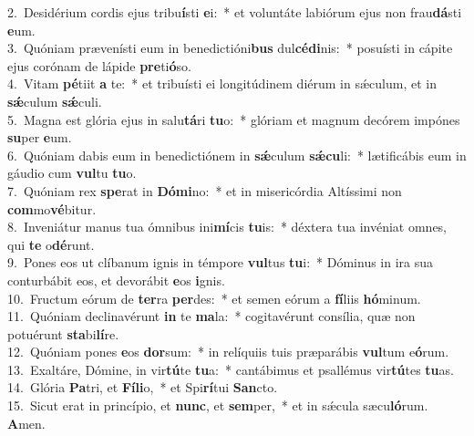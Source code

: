 {2.~}Desidérium cordis ejus tribu\textbf{í}sti \textbf{e}i:~* et voluntáte labiórum ejus non frau\textbf{dá}sti \textbf{e}um.\\
{3.~}Quóniam prævenísti eum in benedictióni\textbf{bus} dul\textbf{cé}\textbf{di}nis:~* posuísti in cápite ejus corónam de lápide \textbf{pre}ti\textbf{ó}so.\\
{4.~}Vitam \textbf{pé}tiit \textbf{a} te:~* et tribuísti ei longitúdinem diérum in sǽculum, et in \textbf{sǽ}culum \textbf{sǽ}culi.\\
{5.~}Magna est glória ejus in salu\textbf{tá}ri \textbf{tu}o:~* glóriam et magnum decórem impónes \textbf{su}per \textbf{e}um.\\
{6.~}Quóniam dabis eum in benedictiónem in \textbf{sǽ}culum \textbf{sǽ}\textbf{cu}li:~* lætificábis eum in gáudio cum \textbf{vul}tu \textbf{tu}o.\\
{7.~}Quóniam rex \textbf{spe}rat in \textbf{Dó}\textbf{mi}no:~* et in misericórdia Altíssimi non \textbf{com}mo\textbf{vé}bitur.\\
{8.~}Inveniátur manus tua ómnibus ini\textbf{mí}cis \textbf{tu}is:~* déxtera tua invéniat omnes, qui \textbf{te} o\textbf{dé}runt.\\
{9.~}Pones eos ut clíbanum ignis in témpore \textbf{vul}tus \textbf{tu}i:~* Dóminus in ira sua conturbábit eos, et devorábit \textbf{e}os \textbf{i}gnis.\\
{10.~}Fructum eórum de \textbf{ter}ra \textbf{per}des:~* et semen eórum a \textbf{fí}liis \textbf{hó}minum.\\
{11.~}Quóniam declinavérunt \textbf{in} te \textbf{ma}la:~* cogitavérunt consília, quæ non potuérunt \textbf{sta}bi\textbf{lí}re.\\
{12.~}Quóniam pones \textbf{e}os \textbf{dor}sum:~* in relíquiis tuis præparábis \textbf{vul}tum e\textbf{ó}rum.\\
{13.~}Exaltáre, Dómine, in vir\textbf{tú}te \textbf{tu}a:~* cantábimus et psallémus vir\textbf{tú}tes \textbf{tu}as.\\
{14.~}Glória \textbf{Pa}tri, et \textbf{Fí}\textbf{li}o,~* et Spi\textbf{rí}tui \textbf{San}cto.\\
{15.~}Sicut erat in princípio, et \textbf{nunc}, et \textbf{sem}per,~* et in sǽcula sæcu\textbf{ló}rum. \textbf{A}men.\\
